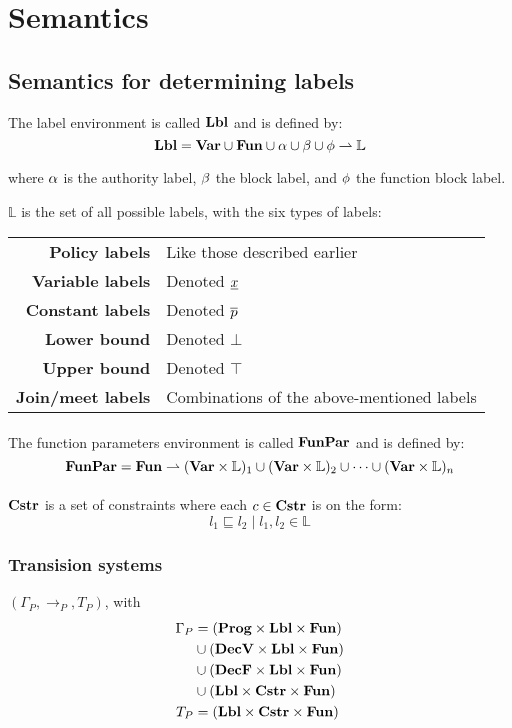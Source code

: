 \section{Semantics}

\subsection{Semantics for determining labels}
The label environment is called $\mathbf{Lbl}$ and is defined by:
\[
  \mathbf{Lbl} = \mathbf{Var} \cup \mathbf{Fun} \cup \alpha \cup \beta \cup \phi \rightharpoonup \mathbb{L}
\]

\noindent where $\alpha$ is the authority label, $\beta$ the block label, and $\phi$ the function block label.

\noindent $\mathbb{L}$ is the set of all possible labels, with the six types of labels: \\

\begin{tabular}{rl}
  \textbf{Policy labels}    & Like those described earlier \\
  \textbf{Variable labels}  & Denoted $\underline{x}$ \\
  \textbf{Constant labels}  & Denoted $\overline{p}$ \\
  \textbf{Lower bound}      & Denoted $\bot$ \\
  \textbf{Upper bound}      & Denoted $\top$ \\
  \textbf{Join/meet labels} & Combinations of the above-mentioned labels
\end{tabular}

\paragraph{}\noindent
The function parameters environment is called $\mathbf{FunPar}$ and is defined by:
\[
  \mathbf{FunPar} = \mathbf{Fun} \rightharpoonup (\mathbf{Var} \times \mathbb{L})_1 \cup (\mathbf{Var} \times \mathbb{L})_2 \cup \dots \cup (\mathbf{Var} \times \mathbb{L})_n
\]

\paragraph{}\noindent
$\mathbf{Cstr}$ is a set of constraints where each $c \in \mathbf{Cstr}$ is on the form:
\[ l_1 \sqsubseteq l_2 \; | \; l_1, l_2 \in \mathbb{L} \]


\subsubsection{Transision systems}
$(\Gamma_P, \rightarrow_P, T_P)$, with
\begin{align*}
  \Gamma_P  & = (\mathbf{Prog} \times \mathbf{Lbl} \times \mathbf{Fun}) \\
            & \cup (\mathbf{DecV} \times \mathbf{Lbl} \times \mathbf{Fun}) \\
            & \cup (\mathbf{DecF} \times \mathbf{Lbl} \times \mathbf{Fun}) \\
            & \cup (\mathbf{Lbl} \times \mathbf{Cstr} \times \mathbf{Fun}) \\
  T_P       & = (\mathbf{Lbl} \times \mathbf{Cstr} \times \mathbf{Fun})
\end{align*}

